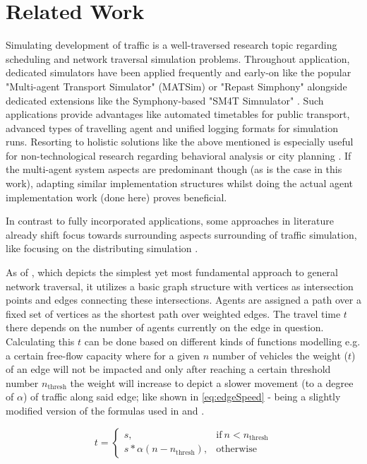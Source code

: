 \section{Related Work}\label{sec:relatedWork}

Simulating development of traffic is a well-traversed research topic regarding scheduling and network traversal simulation problems.
Throughout application, dedicated simulators have been applied frequently and early-on like the popular "Multi-agent Transport Simulator" (MATSim) \cite{sezen2003modeling} or "Repast Simphony" \cite{zargayouna2013agent} alongside dedicated extensions like the Symphony-based "SM4T Simnulator" \cite{ksontini2016building}.
Such applications provide advantages like automated timetables for public transport, advanced types of travelling agent and unified logging formats for simulation runs.
Resorting to holistic solutions like the above mentioned is especially useful for non-technological research regarding behavioral analysis or city planning \cite{brakewood2018literature}. If the multi-agent system aspects are predominant though (as is the case in this work), adapting similar implementation structures whilst doing the actual agent implementation work (done here) proves beneficial.

In contrast to fully incorporated applications, some approaches in literature already shift focus towards surrounding aspects surrounding of traffic simulation, like focusing on the distributing simulation \cite{mastio2015towards}.

As of \cite{mastio2015towards}, which depicts the simplest yet most fundamental approach to general network traversal, it utilizes a basic graph structure with vertices as intersection points and edges connecting these intersections. Agents are assigned a path over a fixed set of vertices as the shortest path over weighted edges. The travel time $t$ there depends on the number of agents currently on the edge in question. Calculating this $t$ can be done based on different kinds of functions modelling e.g. a certain free-flow capacity where for a given $n$ number of vehicles the weight ($t$) of an edge will not be impacted and only after reaching a certain threshold number $n_{\text{thresh}}$ the weight will increase to depict a slower movement (to a degree of $\alpha$) of traffic along said edge; like shown in \autoref{eq:edgeSpeed} - being a slightly modified version of the formulas used in \cite{mastio2015towards} and \cite{ksontini2016building}.

\begin{equation}\label{eq:edgeSpeed}
    t = 
    \begin{cases}
        s, & \text{if}\ n < n_{\text{thresh}} \\
        s * \alpha(n - n_{\text{thresh}}), & \text{otherwise}
    \end{cases}
\end{equation}

